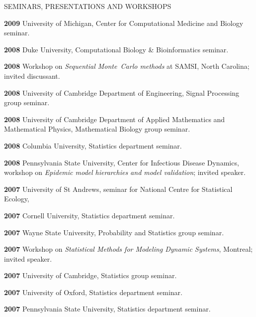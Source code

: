 \begin{mylist}{SEMINARS, PRESENTATIONS AND WORKSHOPS}
\item{\bf 2009 } University of Michigan, Center for Computational Medicine and Biology seminar.


\item{\bf 2008 } Duke University, Computational Biology \& Bioinformatics seminar.

\item{\bf 2008 } Workshop on {\it Sequential Monte~Carlo methods} at SAMSI, North Carolina; invited discussant.

\item{\bf 2008 } University of Cambridge Department of Engineering, Signal Processing group seminar.

\item{\bf 2008 } University of Cambridge Department of Applied Mathematics and Mathematical Physics, Mathematical Biology group seminar.

\item{\bf 2008 } Columbia University, Statistics department seminar.

\item{\bf 2008 } Pennsylvania State University, Center for Infectious Disease Dynamics, workshop on {\it Epidemic model hierarchies and model validation}; invited speaker.

\item{\bf 2007 } University of St Andrews, seminar for National Centre for Statistical Ecology, 

\item{\bf 2007 } Cornell University, Statistics department seminar.

\item{\bf 2007 } Wayne State University, Probability and Statistics group seminar.
 	
\item{\bf 2007 }  Workshop on {\it Statistical Methods for Modeling Dynamic Systems}, Montreal; invited speaker.

\item{\bf 2007 } University of Cambridge, Statistics group seminar.

\item{\bf 2007 } University of Oxford, Statistics department seminar.


\item{\bf 2007 } Pennsylvania State University, Statistics department seminar.


\end{mylist}
